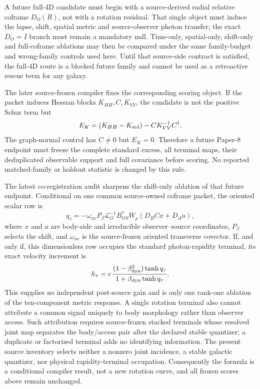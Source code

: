 \documentclass[11pt]{article}
\begin{document}
A future full-4D candidate must begin with a source-derived radial relative
coframe $D_O(R)$, not with a rotation residual.  That single object must
induce the lapse, shift, spatial metric and source-observer photon transfer;
the exact $D_O=I$ branch must remain a mandatory null.  Time-only,
spatial-only, shift-only and full-coframe ablations may then be compared under
the same family-budget and wrong-family controls used here.  Until that
source-side contract is satisfied, the full-4D route is a blocked future
family and cannot be used as a retroactive rescue term for any galaxy.

The later source-frozen compiler fixes the corresponding scoring object.  If
the packet induces Hessian blocks \(K_{HH},C,K_{VV}\), the candidate is not
the positive Schur term but
\[
 E_K=(K_{HH}-K_{\rm std})-CK_{VV}^{-1}C^\dagger.
\]
The graph-normal control has \(C\neq0\) but \(E_K=0\).  Therefore a future
Paper-8 endpoint must freeze the complete standard excess, all terminal maps,
their deduplicated observable support and full covariance before scoring.  No
reported matched-family or holdout statistic is changed by this rule.

The latest co-registration audit sharpens the shift-only ablation of that
future endpoint.  Conditional on one common source-owned coframe packet, the
oriented scalar row is
\[
 q_\tau
 =-\omega_{uv}P_\beta\mathcal L_O^{-1}B_{OS}^{*}W_\rho
   (D_BCx+D_Aa),
\]
where \(x\) and \(a\) are body-side and irreducible observer--source
coordinates, \(P_\beta\) selects the shift, and \(\omega_{uv}\) is the
source-frozen oriented transverse covector.  If, and only if, this
dimensionless row occupies the standard photon-rapidity terminal, its exact
velocity increment is
\[
 h_\tau
 =c\,\frac{(1-\beta_{\rm dyn}^{2})\tanh q_\tau}{1+\beta_{\rm dyn}\tanh q_\tau}.
\]
This supplies no independent post-source gain and is only one rank-one
ablation of the ten-component metric response.  A single rotation terminal
also cannot attribute a common signal uniquely to body morphology rather than
observer access.  Such attribution requires source-frozen stacked terminals
whose resolved joint map separates the body/access pair after the declared
stable quantizer; a duplicate or factorized terminal adds no identifying
information.  The present source inventory selects neither a nonzero joint
incidence, a stable galactic quantizer, nor physical rapidity-terminal
occupation.  Consequently the formula is a conditional compiler result, not
a new rotation curve, and all frozen scores above remain unchanged.
\end{document}

